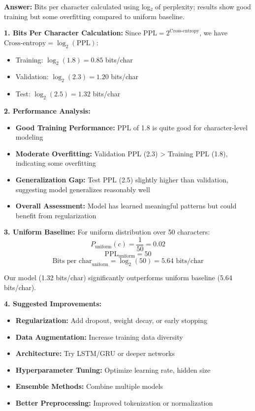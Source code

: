 \documentclass[12pt]{article}
\newcommand{\answer}[1]{{\color{answercolor}\textbf{Answer:} #1}}
\newcommand{\explanation}[1]{{\color{explanationcolor}#1}}
\begin{document}
\begin{enumerate}[(a)]
    \answer{Bits per character calculated using log₂ of perplexity; results show good training but some overfitting compared to uniform baseline.}
    
    \explanation{
    \textbf{1. Bits Per Character Calculation:}
    Since $\text{PPL} = 2^{\text{Cross-entropy}}$, we have $\text{Cross-entropy} = \log_2(\text{PPL})$:
    
    \begin{itemize}
        \item Training: $\log_2(1.8) = 0.85$ bits/char
        \item Validation: $\log_2(2.3) = 1.20$ bits/char  
        \item Test: $\log_2(2.5) = 1.32$ bits/char
    \end{itemize}
    
    \textbf{2. Performance Analysis:}
    \begin{itemize}
        \item \textbf{Good Training Performance:} PPL of 1.8 is quite good for character-level modeling
        \item \textbf{Moderate Overfitting:} Validation PPL (2.3) > Training PPL (1.8), indicating some overfitting
        \item \textbf{Generalization Gap:} Test PPL (2.5) slightly higher than validation, suggesting model generalizes reasonably well
        \item \textbf{Overall Assessment:} Model has learned meaningful patterns but could benefit from regularization
    \end{itemize}
    
    \textbf{3. Uniform Baseline:}
    For uniform distribution over 50 characters:
    $$P_{\text{uniform}}(c) = \frac{1}{50} = 0.02$$
    $$\text{PPL}_{\text{uniform}} = 50$$
    $$\text{Bits per char}_{\text{uniform}} = \log_2(50) = 5.64 \text{ bits/char}$$
    
    Our model (1.32 bits/char) significantly outperforms uniform baseline (5.64 bits/char).
    
    \textbf{4. Suggested Improvements:}
    \begin{itemize}
        \item \textbf{Regularization:} Add dropout, weight decay, or early stopping
        \item \textbf{Data Augmentation:} Increase training data diversity
        \item \textbf{Architecture:} Try LSTM/GRU or deeper networks
        \item \textbf{Hyperparameter Tuning:} Optimize learning rate, hidden size
        \item \textbf{Ensemble Methods:} Combine multiple models
        \item \textbf{Better Preprocessing:} Improved tokenization or normalization
    \end{itemize}
    }
\end{enumerate}
\end{document}
